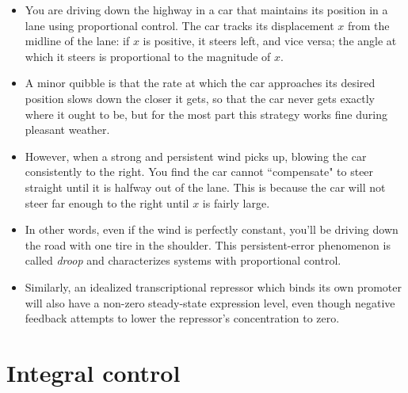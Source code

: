 \documentclass{article}
\begin{document}
\begin{itemize}
\item You are driving down the highway in a car that maintains its position in a lane using proportional control. The car tracks its displacement $x$ from the midline of the lane: if $x$ is positive, it steers left, and vice versa; the angle at which it steers is proportional to the magnitude of $x$.

\item A minor quibble is that the rate at which the car approaches its desired position slows down the closer it gets, so that the car never gets exactly where it ought to be, but for the most part this strategy works fine during pleasant weather.

\item However, when a strong and persistent wind picks up, blowing the car consistently to the right. You find the car cannot ``compensate" to steer straight until it is halfway out of the lane. This is because the car will not steer far enough to the right until $x$ is fairly large.

\item In other words, even if the wind is perfectly constant, you'll be driving down the road with one tire in the shoulder. This persistent-error phenomenon is called \textit{droop} and characterizes systems with proportional control.

\item Similarly, an idealized transcriptional repressor which binds its own promoter will also have a non-zero steady-state expression level, even though negative feedback attempts to lower the repressor's concentration to zero.
\end{itemize}

\section*{Integral control}
\end{document}
